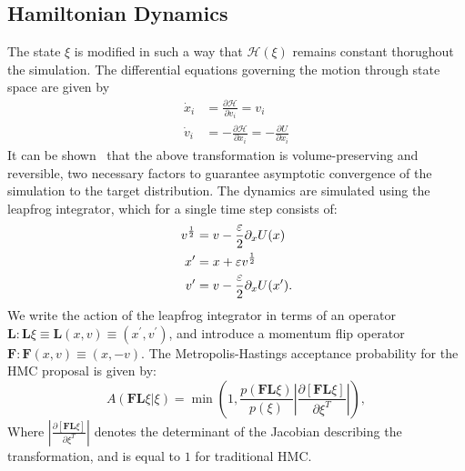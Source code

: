 \documentclass[../main.tex]{subfiles}
\begin{document}
\subsection{Hamiltonian Dynamics}
%
The state $\xi$ is modified in such a way that $\mathcal{H}(\xi)$ remains constant thorughout the simulation.
%
The differential equations governing the motion through state space are given by
%
\begin{align}
    \dot x_i &= \frac{\partial \mathcal{H}}{\partial v_i} = v_i\\
    \dot v_i &= -\frac{\partial \mathcal{H}}{\partial x_i} = - \frac{\partial
        U}{\partial x_i}
\label{eq:hamiltons_equations}
\end{align}
%
It can be shown~\cite{2012arXiv1206.1901N} that the above transformation is volume-preserving and reversible, two
necessary factors to guarantee asymptotic convergence of the simulation to the target distribution.
%
The dynamics are simulated using the leapfrog integrator, which for a single time step consists of:
%
\begin{align}
    v^{\frac{1}{2}} &= v - \frac{{\varepsilon}}{2} \partial_x U(x)\\
    x^{\prime} &= x + {\varepsilon} v^{\frac{1}{2}}\\
    v^{\prime} &= v - \frac{{\varepsilon}}{2} \partial_x U(x^{\prime}).
    \label{eq:generic_leapfrog}
\end{align}
%
We write the action of the leapfrog integrator in terms of an operator $\mathbf{L}: \mathbf{L}\xi \equiv \mathbf{L}(x,
v) \equiv (x^{\prime}, v^{\prime})$, and introduce a momentum flip operator $\mathbf{F}: \mathbf{F}(x, v) \equiv (x,
-v)$.
%
The Metropolis-Hastings acceptance probability for the HMC proposal is given by:
%
\begin{equation}
    A(\mathbf{F}\mathbf{L} \xi | \xi) = \min\left(1,
        \frac{p(\mathbf{F}\mathbf{L}\xi)}{p(\xi)}\left|
        \frac{\partial\left[\mathbf{F}\mathbf{L}\xi\right]}
        {\partial\xi^{T}}\right|\right),
\label{eq:metropolis_hastings}
\end{equation}
%
Where $\left|\frac{\partial\left[\mathbf{F}\mathbf{L}\xi\right]} {\partial\xi^{T}}\right|$ denotes the determinant of
the Jacobian describing the transformation, and is equal to $1$ for traditional HMC.\@
%
\end{document}
